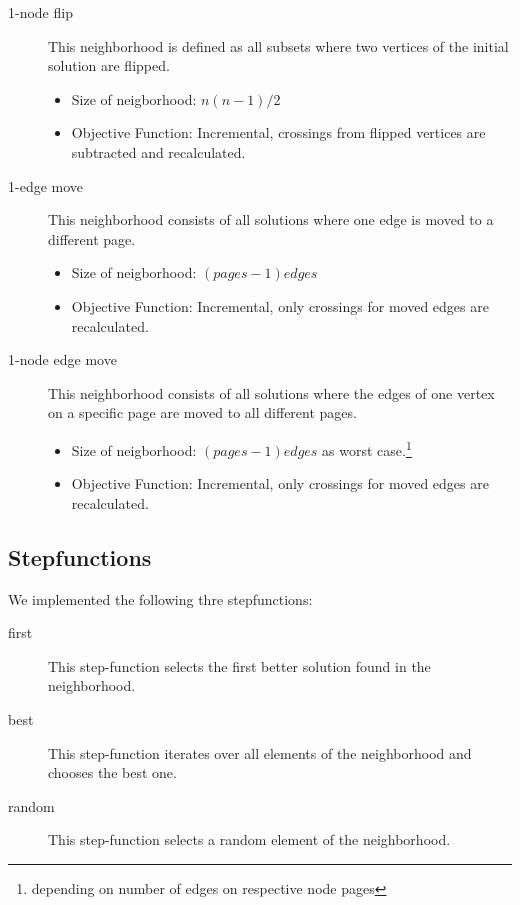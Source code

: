 \documentclass{scrartcl}
\begin{document}
\begin{description}
\item[1-node flip] 
    
    This neighborhood is defined as all subsets where two vertices of the initial solution are flipped. 
    \begin{itemize}
        \item Size of neigborhood: $n(n-1)/2$
        \item Objective Function: Incremental, crossings from flipped vertices are subtracted and recalculated.

    \end{itemize}

	
\item[1-edge move] This neighborhood consists of all solutions where one edge is moved to a different page. 
     \begin{itemize}
        \item Size of neigborhood: $(pages-1) edges$ 
        \item Objective Function: Incremental, only crossings for moved edges are recalculated.
    \end{itemize}
   
	
\item[1-node edge move] This neighborhood consists of all solutions where the edges of
	one vertex on a specific page are moved to all different pages. 

    \begin{itemize}
        \item Size of neigborhood: $(pages-1) edges$ as worst case.\footnote{depending on number of edges on respective node pages}
        \item Objective Function: Incremental, only crossings for moved edges are recalculated.
    \end{itemize}
    

\end{description}

\subsection{Stepfunctions}

We implemented the following thre stepfunctions:

\begin{description}
\item[first] This step-function selects the first better solution found in the neighborhood.
\item[best] This step-function iterates over all elements of the neighborhood and chooses the best one.
\item[random] This step-function selects a random element of the neighborhood. 
\end{description}
\end{document}
